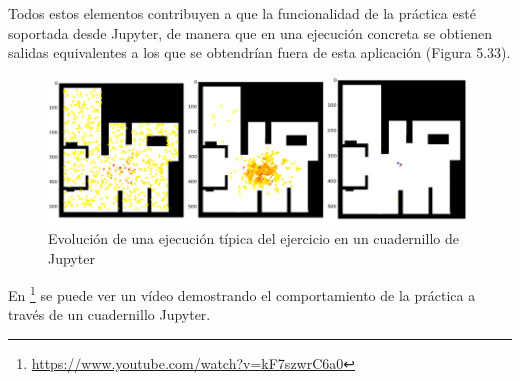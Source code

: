 Todos estos elementos contribuyen a que la funcionalidad de la práctica esté soportada desde Jupyter, de manera que en una ejecución concreta se obtienen salidas equivalentes a los que se obtendrían fuera de esta aplicación (Figura 5.33).

\begin{figure}[H]
	\begin{center}
		\includegraphics[width=0.99\textwidth]{figures/outputjupyterll.png}
		\caption{Evolución de una ejecución típica del ejercicio en un cuadernillo de Jupyter}
		\label{fig.laserjupyter}
	\end{center}
\end{figure}

En \footnote{\url{https://www.youtube.com/watch?v=kF7szwrC6a0}} se puede ver un vídeo demostrando el comportamiento de la práctica a través de un cuadernillo Jupyter.